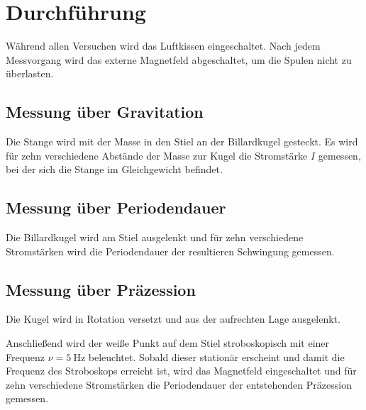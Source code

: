 \section{Durchführung}
\label{sec:Durchführung}

Während allen Versuchen wird das Luftkissen eingeschaltet.
Nach jedem Messvorgang wird das externe Magnetfeld abgeschaltet, um die Spulen nicht zu überlasten.



\subsection{Messung über Gravitation} 

Die Stange wird mit der Masse in den Stiel an der Billardkugel gesteckt.
Es wird für zehn verschiedene Abstände der Masse zur Kugel die Stromstärke $I$ gemessen, bei der sich die Stange im Gleichgewicht befindet.


\subsection{Messung über Periodendauer}


Die Billardkugel wird am Stiel ausgelenkt und für zehn verschiedene Stromstärken wird die Periodendauer der resultieren Schwingung gemessen.


\subsection{Messung über Präzession}


Die Kugel wird in Rotation versetzt und aus der aufrechten Lage ausgelenkt.

Anschließend wird der weiße Punkt auf dem Stiel stroboskopisch mit einer Frequenz $\nu = \SI{5}{\hertz}$ beleuchtet. 
Sobald dieser stationär erscheint und damit die Frequenz des Stroboskops erreicht ist, wird das Magnetfeld eingeschaltet und für zehn verschiedene Stromstärken die Periodendauer der entstehenden Präzession gemessen.

